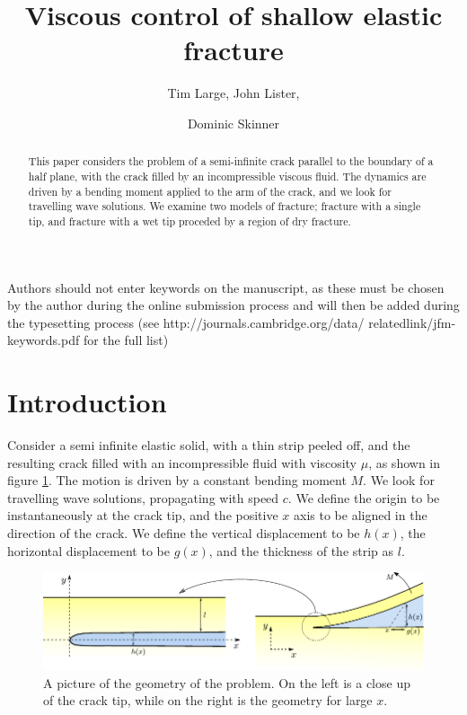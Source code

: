 \documentclass{jfm}
\title{Viscous control of shallow elastic fracture}
\author{Tim Large\aff{1},
  John Lister\aff{2},
 \and Dominic Skinner\aff{2}}
\affiliation{\aff{1} Massachusetts Institute of Technology, USA
\aff{2}Department of Applied Mathematics and Theoretical Physics, University of
Cambridge, UK}
\begin{document}
\maketitle

\begin{abstract}
This paper considers the problem of a semi-infinite crack parallel to the
boundary of a half plane, with the crack filled by an incompressible viscous
fluid. 
The dynamics are driven by a bending moment applied to the arm of the crack,
and we look for travelling wave solutions. We examine two models of fracture;
fracture with a single tip, and fracture with a wet tip proceded by a region
of dry fracture.
\end{abstract}

\begin{keywords}
Authors should not enter keywords on the manuscript, as these must be chosen by the 
author during the online submission process and will then be added during the 
typesetting process (see http://journals.cambridge.org/data/
\linebreak[3]relatedlink/jfm-\linebreak[3]keywords.pdf for the full list)
\end{keywords}

\section{Introduction}\label{sec:introduction}
Consider a semi infinite elastic solid, with a thin strip peeled off, and the
resulting crack filled with an incompressible fluid with viscosity $\mu$, as
shown in figure \ref{fig:diagram}. The
motion is driven by a constant bending moment $M$. We look for travelling wave
solutions, propagating with speed $c$. We define the origin to be 
instantaneously at the crack tip, and the positive $x$ axis to be aligned
in the direction of the crack.
We define the vertical displacement to be $h(x)$, the horizontal 
displacement to be $g(x)$, and the thickness of the strip as $l$.
%
\begin{figure}
  \centerline{\includegraphics{diag1.pdf}}\label{fig:diagram}
  \caption{A picture of the geometry of the problem. On the left is a close 
           up of the crack tip, while on the right is the geometry for large
           $x$.}
\end{figure}
%
\end{document}
